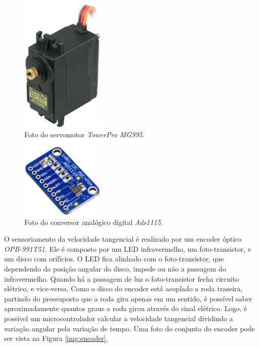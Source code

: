     	\begin{figure}[h]
            \centering
            \includegraphics[width=4cm]{Imagens/cap2/995.png}
            \caption{Foto do servomotor \textit{TowerPro MG995}.}
            \label{img:theta}
        \end{figure}
        
        \begin{figure}[h]
            \centering
            \includegraphics[width=4cm]{Imagens/cap2/ads.png}
            \caption{Foto do conversor analógico digital \textit{Ads1115}.}
            \label{img:theta}
        \end{figure}
        
    	O sensoriamento da velocidade tangencial é realizado por um encoder óptico \textit{OPB-991T51}. Ele é composto por um LED infravermelho, um foto-transistor, e um disco com orifícios. O LED fica alinhado com o foto-transistor, que dependendo da posição angular do disco, impede ou não a passagem do infravermelho. Quando há a passagem de luz o foto-transistor fecha circuito elétrico, e vice-versa. Como o disco do encoder está acoplado a roda traseira, partindo do pressuposto que a roda gira apenas em um sentido, é possível saber aproximadamente quantos graus a roda girou através do sinal elétrico. Logo, é possível um microcontrolador calcular a velocidade tangencial dividindo a variação angular pela variação de tempo. Uma foto do conjunto do encoder pode ser vista na Figura \ref{img:encoder},
    	

